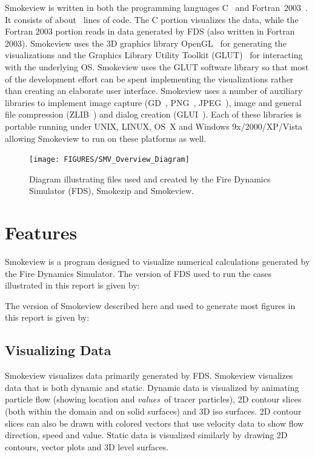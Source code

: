 \documentclass[11pt,twoside]{book}
\begin{document}
Smokeview is written in both the programming languages
C~\cite{C:book} and Fortran~2003~\cite{Fortran:book}.  It consists
of about \smvlines\ lines of code. The C portion visualizes the
data, while the Fortran 2003 portion reads in data generated by
FDS (also written in Fortran 2003). Smokeview uses the 3D graphics
library OpenGL~\cite{OpenGLRed} for generating the visualizations
and the Graphics Library Utility Toolkit (GLUT)~\cite{OpenGLGlut}
for interacting with the underlying OS. Smokeview uses the GLUT
software library so that most of the development effort can be
spent implementing the visualizations rather than creating an
elaborate user interface. Smokeview uses a number of auxiliary
libraries to implement image capture (GD~\cite{BOUTELL,GDLIB},
PNG~\cite{PNGLIB}, JPEG~\cite{JPEGLIB}), image and general file
compression (ZLIB~\cite{ZLIB}) and dialog creation
(GLUI~\cite{GLUILIB}). Each of these libraries is portable running
under UNIX, LINUX, OS~X and Windows 9x/2000/XP/Vista allowing
Smokeview to run on these platforms as well.
\begin{figure}[\figoptions]
\centerline{
\texttt{[image: FIGURES/SMV\_Overview\_Diagram]}}
 \caption[FDS file overview]{Diagram illustrating files used and created by the Fire Dynamics
 Simulator (FDS), Smokezip and Smokeview.}
\label{figfdsoverview}%
\end{figure}

\section{Features}

Smokeview is a program designed to visualize numerical
calculations generated by the Fire Dynamics Simulator.
The version of FDS used to run the cases illustrated  in this report
is given by:

The version of Smokeview described here and used
to generate most figures in this report is given by:


\subsection{Visualizing Data}

Smokeview visualizes data primarily generated by FDS.
Smokeview visualizes data that is both dynamic and static.  Dynamic
data is visualized by animating particle flow (showing
location and {\em values}\ of tracer particles), 2D contour
slices (both within the domain and on solid surfaces) and
3D iso surfaces.  2D contour slices can also be drawn
with colored vectors that use velocity data to show flow
direction, speed and value. Static data is visualized
similarly by drawing 2D contours, vector plots and 3D level
surfaces.
\end{document}
